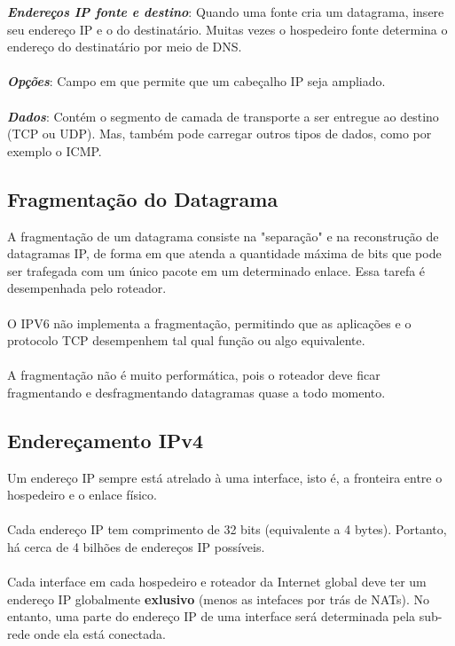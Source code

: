 \documentclass[a4paper, 12pt]{article}
\begin{document}
            \textbf{\textit{Endereços IP fonte e destino}}: Quando uma fonte cria um datagrama, insere seu endereço IP e o do destinatário.
            Muitas vezes o hospedeiro fonte determina o endereço do destinatário por meio de DNS.
            \\\\
            \textbf{\textit{Opções}}: Campo em que permite que um cabeçalho IP seja ampliado.
            \\\\
            \textbf{\textit{Dados}}: Contém o segmento de camada de transporte a ser entregue ao destino (TCP ou UDP). Mas, também pode
            carregar outros tipos de dados, como por exemplo o ICMP.

    \subsection{Fragmentação do Datagrama}
        A fragmentação de um datagrama consiste na "separação" e na reconstrução de datagramas IP, de forma em que atenda a quantidade
        máxima de bits que pode ser trafegada com um único pacote em um determinado enlace. Essa tarefa é desempenhada pelo roteador.
        \\\\
        O IPV6 não implementa a fragmentação, permitindo que as aplicações e o protocolo TCP desempenhem tal qual função ou algo equivalente.
        \\\\
        A fragmentação não é muito performática, pois o roteador deve ficar fragmentando e desfragmentando datagramas quase a todo 
        momento.

    \subsection{Endereçamento IPv4}
        Um endereço IP sempre está atrelado à uma interface, isto é, a fronteira entre o hospedeiro e o enlace físico.
        \\\\
        Cada endereço IP tem comprimento de 32 bits (equivalente a 4 bytes). Portanto, há cerca de  4 bilhões de endereços IP
        possíveis.
        \\\\
        Cada interface em cada hospedeiro e roteador da Internet global deve ter um endereço IP globalmente \textbf{exlusivo} (menos
        as intefaces por trás de NATs). No entanto, uma parte do endereço IP de uma interface será determinada pela sub-rede onde 
        ela está conectada.
        
\end{document}
